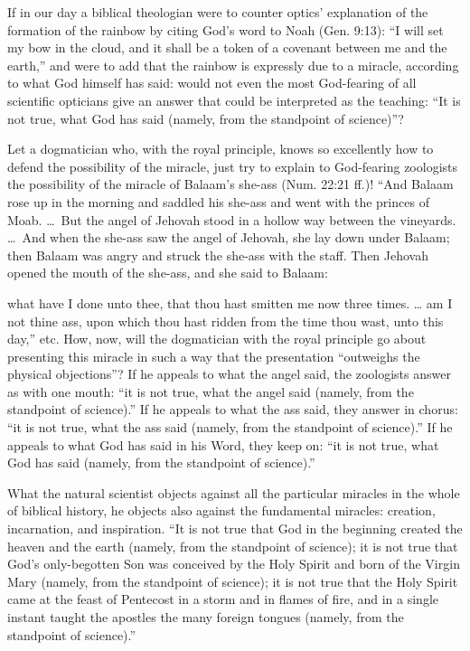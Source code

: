 \documentclass[12pt]{book}
\newcommand{\opage}[1]{\marginnote{\footnotesize\textit{[#1]}}}
\begin{document}
If in our day a biblical theologian were to counter optics' explanation of the formation of the rainbow by citing God's word to Noah (Gen. 9:13): ``I will set my bow in the cloud, and it shall be a token of a covenant between me and the earth,'' and were to add that the rainbow is expressly due to a miracle, according to what God himself has said: would not even the most God-fearing of all scientific opticians give an answer that could be interpreted as the teaching: ``It is not true, what God has said (namely, from the standpoint of science)''?

Let a dogmatician who, with the royal principle, knows so excellently how to defend the possibility of the miracle, just try to explain to God-fearing zoologists the possibility of the miracle of Balaam's she-ass (Num. 22:21 ff.)! ``And Balaam rose up in the morning and saddled his she-ass and went with the princes of Moab. \dots\ But the angel of Jehovah stood in a hollow way between the vineyards. \dots\ And when the she-ass saw the angel of Jehovah, she lay down under Balaam; then Balaam was angry and struck the she-ass with the staff. Then Jehovah opened the mouth of the she-ass, and she said to Balaam:

\opage{27}\setcounter{footnote}{0}%
what have I done unto thee, that thou hast smitten me now three times. \dots{} am I not thine ass, upon which thou hast ridden from the time thou wast, unto this day,'' etc. How, now, will the dogmatician with the royal principle go about presenting this miracle in such a way that the presentation ``outweighs the physical objections''? If he appeals to what the angel said, the zoologists answer as with one mouth: ``it is not true, what the angel said (namely, from the standpoint of science).'' If he appeals to what the ass said, they answer in chorus: ``it is not true, what the ass said (namely, from the standpoint of science).'' If he appeals to what God has said in his Word, they keep on: ``it is not true, what God has said (namely, from the standpoint of science).''

What the natural scientist objects against all the particular miracles in the whole of biblical history, he objects also against the fundamental miracles: creation, incarnation, and inspiration. ``It is not true that God in the beginning created the heaven and the earth (namely, from the standpoint of science); it is not true that God's only-begotten Son was conceived by the Holy Spirit and born of the Virgin Mary (namely, from the standpoint of science); it is not true that the Holy Spirit came at the feast of Pentecost in a storm and in flames of fire, and in a single instant taught the apostles the many foreign tongues (namely, from the standpoint of science).''
\end{document}
